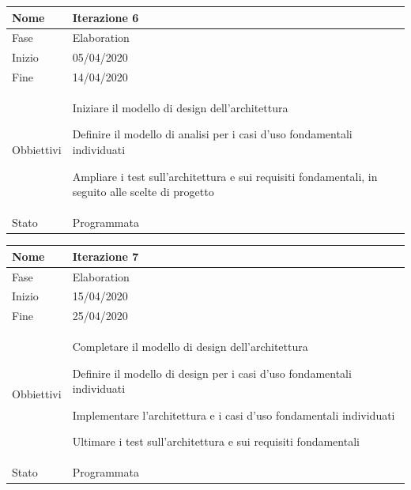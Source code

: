 \begin{center}
\begin{tabular}{ |p{2cm}|p{10cm}|  }
\hline
Nome & Iterazione 6 \\\hline
Fase & Elaboration \\\hline
Inizio & 05/04/2020 \\\hline
Fine &  14/04/2020  \\\hline
Obbiettivi & 
	\begin{compactitem}		
		\item Iniziare il modello di design dell'architettura
		\item Definire il modello di analisi per i casi d'uso fondamentali individuati
		\item Ampliare i test sull'architettura e sui requisiti fondamentali, in seguito alle scelte di progetto		

	\end{compactitem}\\\hline
Stato &  Programmata \\\hline
\end{tabular}
\label{table:6}\newline

\begin{tabular}{ |p{2cm}|p{10cm}|  }
\hline
Nome & Iterazione 7 \\\hline
Fase & Elaboration \\\hline
Inizio & 15/04/2020 \\\hline
Fine & 25/04/2020 \\\hline
Obbiettivi & 
	\begin{compactitem}
		\item Completare il modello di design dell'architettura
		\item Definire il modello di design per i casi d'uso fondamentali individuati
		\item Implementare l'architettura e i casi d'uso fondamentali individuati
		\item Ultimare i test sull'architettura e sui requisiti fondamentali
	\end{compactitem}\\\hline
Stato &  Programmata \\\hline
\end{tabular}
\label{table:7}\newline


\end{center}
